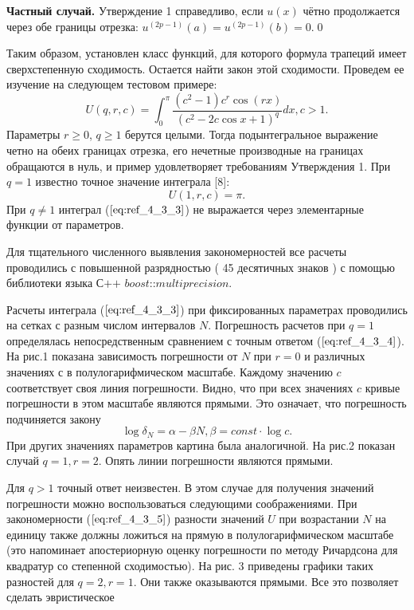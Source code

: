 \textbf{Частный случай.} Утверждение 1 справедливо, если $u(x)$ чётно
продолжается через обе границы отрезка: $u^{(2p-1)}(a)=u^{(2p-1)}(b)=0$.\qed

Таким образом, установлен класс функций, для которого формула
трапеций имеет сверхстепенную сходимость. Остается найти закон этой
сходимости. Проведем ее изучение на следующем тестовом примере:
\begin{equation}
U(q,r,c) = \int_0^{\pi} \frac{(c^2-1)c^r\cos (rx)}{(c^2-2c\cos x+1)^q}dx,c>1.
\label{eq:ref_4_3_3}
\end{equation}
Параметры $r \geqslant 0$, $q \geqslant 1$ берутся целыми. Тогда подынтегральное выражение
четно на обеих границах отрезка, его нечетные производные на границах
обращаются в нуль, и пример удовлетворяет требованиям Утверждения 1. При
$q = 1$ известно точное значение интеграла [8]:
\begin{equation}
U(1,r,c) = \pi.
\label{eq:ref_4_3_4}
\end{equation}
При $q \ne 1$ интеграл ($\ref{eq:ref_4_3_3}$) не выражается через элементарные функции от
параметров.

Для тщательного численного выявления закономерностей все расчеты
проводились с повышенной разрядностью ( 45 десятичных знаков ) с помощью
библиотеки языка $\textit{С++ boost::multiprecision}$.

Расчеты интеграла ($\ref{eq:ref_4_3_3}$) при фиксированных параметрах проводились на
сетках с разным числом интервалов $N$. Погрешность расчетов при $q =1$
определялась непосредственным сравнением с точным ответом ($\ref{eq:ref_4_3_4}$). На рис.1
показана зависимость погрешности от $N$ при $r = 0$ и различных значениях $с$ в
полулогарифмическом масштабе. Каждому значению $c$ соответствует своя
линия погрешности. Видно, что при всех значениях $c$ кривые погрешности в
этом масштабе являются прямыми. Это означает, что погрешность подчиняется
закону
\begin{equation}
\log \delta_N = \alpha - \beta N, \beta = const \cdot \log c.
\label{eq:ref_4_3_5}
\end{equation}
При других значениях параметров картина была аналогичной. На рис.2 показан
случай $q =1,r = 2$. Опять линии погрешности являются прямыми.

Для $q >1$ точный ответ неизвестен. В этом случае для получения значений
погрешности можно воспользоваться следующими соображениями. При
закономерности ($\ref{eq:ref_4_3_5}$) разности значений $U$ при возрастании $N$ на единицу
также должны ложиться на прямую в полулогарифмическом масштабе (это
напоминает апостериорную оценку погрешности по методу Ричардсона для
квадратур со степенной сходимостью). На рис. 3 приведены графики таких
разностей для $q = 2,r = 1$. Они также оказываются прямыми. Все это позволяет
сделать эвристическое

